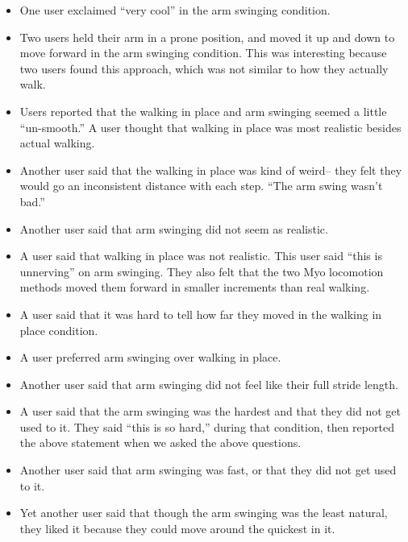 \documentclass[titlepage]{article}
\theoremstyle{definition}
\theoremstyle{proof}
\begin{document}
\begin{itemize}
\item One user exclaimed ``very cool'' in the arm swinging condition.

\item Two users held their arm in a prone position,
  and moved it up and down to move forward in the arm swinging condition.
  This was interesting because two users found this approach,
  which was not similar to how they actually walk.

\item Users reported that the walking in place and arm swinging seemed a little ``un-smooth.''
  A user thought that walking in place was most realistic besides actual walking.

\item Another user said that the walking in place was kind of weird--
  they felt they would go an inconsistent distance with each step.
  ``The arm swing wasn't bad.''

\item Another user said that arm swinging did not seem as realistic.

\item A user said that walking in place was not realistic.
  This user said ``this is unnerving'' on arm swinging.
  They also felt that the two Myo locomotion methods moved them forward in smaller increments than real walking.

\item A user said that it was hard to tell how far they moved in the walking in place condition.

\item A user preferred arm swinging over walking in place.

\item Another user said that arm swinging did not feel like their full stride length.

\item A user said that the arm swinging was the hardest and that they did not get used to it.
  They said ``this is so hard,'' during that condition,
  then reported the above statement when we asked the above questions.

\item Another user said that arm swinging was fast, or that they did not get used to it.

\item Yet another user said that though the arm swinging was the least natural,
  they liked it because they could move around the quickest in it.
\end{itemize}
\end{document}
